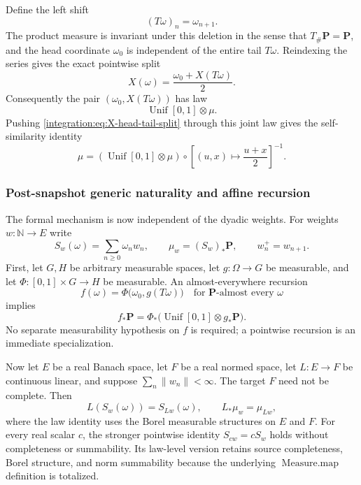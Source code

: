 \documentclass[11pt,oneside]{article}
\theoremstyle{definition}
\theoremstyle{remark}
\newcommand{\N}{\mathbb N}
\begin{document}
Define the left shift
\begin{equation}
 (T\omega)_n=\omega_{n+1}.
 \label{integration:eq:tail-map}
\end{equation}
The product measure is invariant under this deletion in the sense that $T_\#\mathbf P=\mathbf
P$, and the head coordinate $\omega_0$ is independent of the entire tail $T\omega$.  Reindexing
the series gives the exact pointwise split
\begin{equation}
 X(\omega)=\frac{\omega_0+X(T\omega)}2.
 \label{integration:eq:X-head-tail-split}
\end{equation}
Consequently the pair $(\omega_0,X(T\omega))$ has law
\begin{equation}
 \operatorname{Unif}[0,1]\otimes\mu.
 \label{integration:eq:head-tail-law}
\end{equation}
Pushing \eqref{integration:eq:X-head-tail-split} through this joint law gives the self-similarity identity
\begin{equation}
 \mu=\left(\operatorname{Unif}[0,1]\otimes\mu\right)
       \circ\left[(u,x)\mapsto\frac{u+x}{2}\right]^{-1}.
 \label{integration:eq:law-self-similarity}
\end{equation}

\subsubsection{Post-snapshot generic naturality and affine recursion}
\label{integration:sec:weighted-naturality}

The formal mechanism is now independent of the dyadic weights.  For weights \(w:\N\to E\)
write
\[
 S_w(\omega)=\sum_{n\ge0}\omega_nw_n,
 \qquad
 \mu_w=(S_w)_*\mathbf P,
 \qquad
 w_n^+=w_{n+1}.
\]
First, let \(G,H\) be arbitrary measurable spaces, let \(g:\Omega\to G\) be measurable,
and let \(\Phi:[0,1]\times G\to H\) be measurable.  An almost-everywhere recursion
\[
 f(\omega)=\Phi\bigl(\omega_0,g(T\omega)\bigr)
 \quad\text{for \(\mathbf P\)-almost every \(\omega\)}
\]
implies
\begin{equation}
 f_*\mathbf P
 =\Phi_*\bigl(\operatorname{Unif}[0,1]\otimes g_*\mathbf P\bigr).
 \label{integration:eq:generic-ae-recursion}
\end{equation}
No separate measurability hypothesis on \(f\) is required; a pointwise recursion is an
immediate specialization.

Now let \(E\) be a real Banach space, let \(F\) be a real normed space, let
\(L:E\to F\) be continuous linear, and suppose \(\sum_n\lVert w_n\rVert<\infty\).
The target \(F\) need not be complete.  Then
\begin{equation}
 L(S_w(\omega))=S_{Lw}(\omega),\qquad L_*\mu_w=\mu_{Lw},
 \label{integration:eq:weighted-naturality}
\end{equation}
where the law identity uses the Borel measurable structures on \(E\) and \(F\).
For every real scalar \(c\), the stronger pointwise identity
\(S_{cw}=cS_w\) holds without completeness or summability.  Its law-level version retains
source completeness, Borel structure, and norm summability because the underlying
\(\operatorname{Measure.map}\) definition is totalized.
\end{document}
